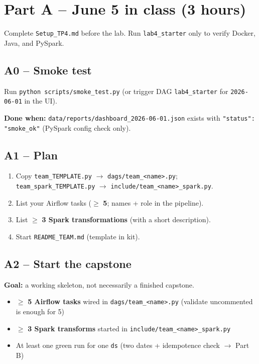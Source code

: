 \documentclass[11pt,a4paper]{article}
\begin{document}
\section*{Part A -- June 5 in class (3 hours)}
\label{sec:parta}

\begin{dangerbox}
Complete \texttt{Setup\_TP4.md} before the lab. Run \texttt{lab4\_starter} only to verify Docker, Java, and PySpark.
\end{dangerbox}

\subsection*{A0 -- Smoke test}

Run \texttt{python scripts/smoke\_test.py} (or trigger DAG \texttt{lab4\_starter} for \texttt{2026-06-01} in the UI).

\noindent\textbf{Done when:} \texttt{data/reports/dashboard\_2026-06-01.json} exists with \texttt{"status": "smoke\_ok"} (PySpark config check only).

\subsection*{A1 -- Plan}

\begin{enumerate}[label=\textbf{A1.\arabic*}]
  \item Copy \texttt{team\_TEMPLATE.py} $\rightarrow$ \texttt{dags/team\_<name>.py};
        \texttt{team\_spark\_TEMPLATE.py} $\rightarrow$ \texttt{include/team\_<name>\_spark.py}.
  \item List your Airflow tasks ($\geq$ \textbf{5}; names + role in the pipeline).
  \item List $\geq$ \textbf{3 Spark transformations} (with a short description).
  \item Start \texttt{README\_TEAM.md} (template in kit).
\end{enumerate}

\subsection*{A2 -- Start the capstone}

\textbf{Goal:} a working skeleton, not necessarily a finished capstone.

\begin{itemize}[nosep]
  \item[$\square$] $\geq$ \textbf{5 Airflow tasks} wired in \texttt{dags/team\_<name>.py} (validate uncommented is enough for 5)
  \item[$\square$] $\geq$ \textbf{3 Spark transforms} started in \texttt{include/team\_<name>\_spark.py}
  \item[$\square$] At least one green run for one \texttt{ds} (two dates + idempotence check $\rightarrow$ Part B)
\end{itemize}
\end{document}
